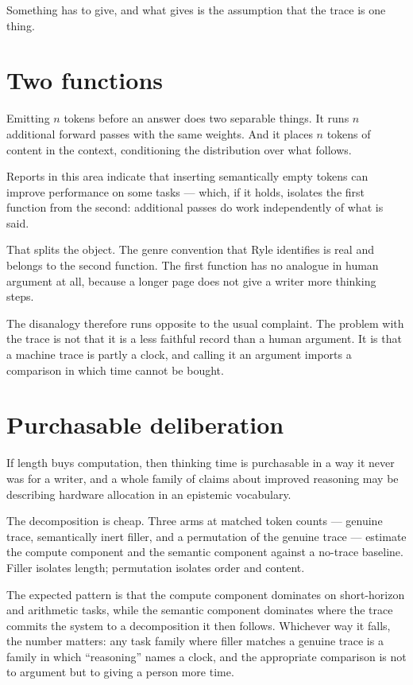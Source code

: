 \documentclass[11pt,a4paper]{article}
\begin{document}
Something has to give, and what gives is the assumption that the trace is one thing.

\section{Two functions}
Emitting $n$ tokens before an answer does two separable things. It runs $n$ additional forward passes with the same weights. And it places $n$ tokens of content in the context, conditioning the distribution over what follows.

Reports in this area indicate that inserting semantically empty tokens can improve performance on some tasks --- which, if it holds, isolates the first function from the second: additional passes do work independently of what is said.

That splits the object. The genre convention that Ryle identifies is real and belongs to the second function. The first function has no analogue in human argument at all, because a longer page does not give a writer more thinking steps.

The disanalogy therefore runs opposite to the usual complaint. The problem with the trace is not that it is a less faithful record than a human argument. It is that a machine trace is partly a clock, and calling it an argument imports a comparison in which time cannot be bought.

\section{Purchasable deliberation}
If length buys computation, then thinking time is purchasable in a way it never was for a writer, and a whole family of claims about improved reasoning may be describing hardware allocation in an epistemic vocabulary.

The decomposition is cheap. Three arms at matched token counts --- genuine trace, semantically inert filler, and a permutation of the genuine trace --- estimate the compute component and the semantic component against a no-trace baseline. Filler isolates length; permutation isolates order and content.

The expected pattern is that the compute component dominates on short-horizon and arithmetic tasks, while the semantic component dominates where the trace commits the system to a decomposition it then follows. Whichever way it falls, the number matters: any task family where filler matches a genuine trace is a family in which ``reasoning'' names a clock, and the appropriate comparison is not to argument but to giving a person more time.
\end{document}

